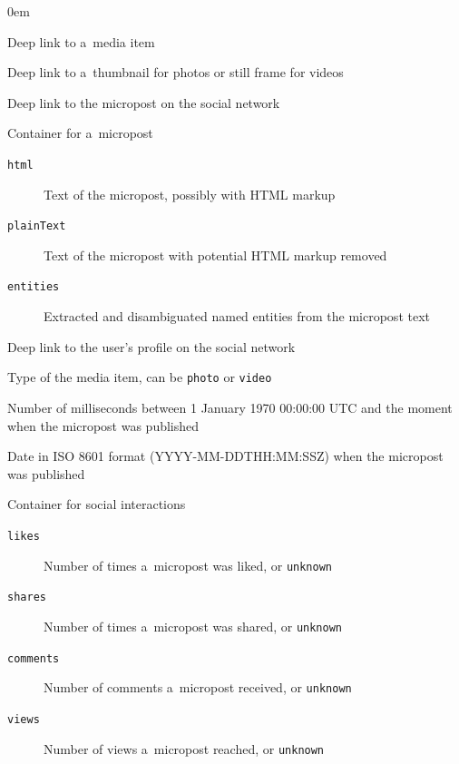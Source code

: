 \begin{description}
  \itemsep0em
  \item[\texttt{mediaUrl}] Deep link to a~media item
  \item[\texttt{posterUrl}] Deep link to a~thumbnail for photos
    or still frame for videos
  \item[\texttt{micropostUrl}] Deep link to the micropost on
    the social network
  \item[\texttt{micropost}] Container for a~micropost
  \begin{description}
    \item[\texttt{html}] Text of the micropost,
      possibly with HTML markup
    \item[\texttt{plainText}] Text of the micropost with
      potential HTML markup removed
    \item[\texttt{entities}] Extracted and disambiguated
      named entities from the micropost text
  \end{description}
  \item[\texttt{userProfileUrl}] Deep link to the user's
    profile on the social network
  \item[\texttt{type}] Type of the media item,
    can be \texttt{photo} or \texttt{video}
  \item[\texttt{timestamp}] Number of milliseconds between
    1 January 1970 00:00:00 UTC and the moment
    when the micropost was published
  \item[\texttt{publicationDate}] Date in ISO 8601
    format (YYYY-MM-DDTHH:MM:SSZ) when the micropost was published
  \item[\texttt{socialInteractions}] Container for social
    interactions
  \begin{description}
  \item[\texttt{likes}] Number of times a~micropost was liked, or
    \texttt{unknown}
  \item[\texttt{shares}] Number of times a~micropost was shared, or
    \texttt{unknown}
  \item[\texttt{comments}] Number of comments a~micropost
    received, or \texttt{unknown}
  \item[\texttt{views}] Number of views a~micropost reached, or
    \texttt{unknown}
  \end{description}
\end{description}

